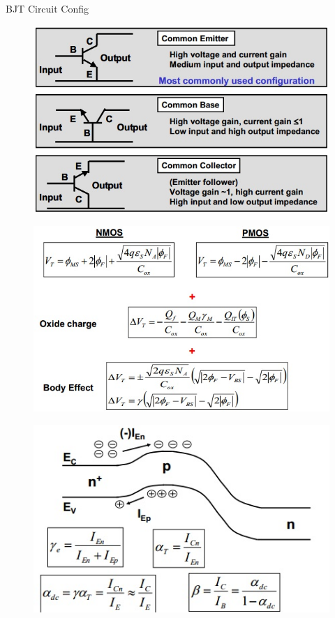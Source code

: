 \documentclass[11pt,landscape]{article}
\begin{document}
\begin{multicols}{3}
BJT Circuit Config
\begin{figure}[H]
    \includegraphics[scale=0.53]{./Images/3/10.jpg}
\end{figure}
\begin{figure}[H]
    \includegraphics[scale=0.53]{./Images/3/13.jpg}
\end{figure}
\begin{figure}[H]
    \includegraphics[scale=0.53]{./Images/3/11.jpg}

\end{figure}
\end{multicols}
\end{document}
